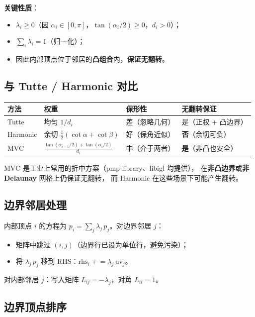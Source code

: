 \documentclass[11pt,a4paper]{article}
\begin{document}
\textbf{关键性质}：
\begin{itemize}
  \item $\lambda_i \ge 0$（因 $\alpha_i \in [0, \pi]$，$\tan(\alpha_i/2) \ge 0$，$d_i > 0$）；
  \item $\sum_i \lambda_i = 1$（归一化）；
  \item 因此内部顶点位于邻居的\textbf{凸组合}内，\textbf{保证无翻转}。
\end{itemize}

\subsection{与 Tutte / Harmonic 对比}

\begin{center}
\renewcommand{\arraystretch}{1.18}
\begin{tabular}{@{}p{2.4cm}p{3.6cm}p{3.6cm}p{4.0cm}@{}}
  \toprule
  \textbf{方法} & \textbf{权重} & \textbf{保形性} & \textbf{无翻转保证} \\
  \midrule
  Tutte   & 均匀 $1/d_i$ & 差（忽略几何） & 是（正权 + 凸边界） \\
  Harmonic & 余切 $\frac{1}{2}(\cot\alpha + \cot\beta)$ & 好（保角近似） & \textbf{否}（余切可负） \\
  MVC      & $\frac{\tan(\alpha_{i-1}/2) + \tan(\alpha_i/2)}{d_i}$ & 中（介于两者） & \textbf{是}（非凸也安全） \\
  \bottomrule
\end{tabular}
\end{center}

MVC 是工业上常用的折中方案（pmp-library、libigl 均提供），
在\textbf{非凸边界}或\textbf{非 Delaunay} 网格上仍保证无翻转，
而 Harmonic 在这些场景下可能产生翻转。

\subsection{边界邻居处理}

内部顶点 $i$ 的方程为 $p_i = \sum_j \lambda_j\, p_j$。对边界邻居 $j$：
\begin{itemize}
  \item 矩阵中跳过 $(i, j)$（边界行已设为单位行，避免污染）；
  \item 将 $\lambda_j\, p_j$ 移到 RHS：$\text{rhs}_i \mathrel{+}= \lambda_j\, \text{uv}_j$。
\end{itemize}
对内部邻居 $j$：写入矩阵 $L_{ij} = -\lambda_j$，对角 $L_{ii} = 1$。

\subsection{边界顶点排序}
\end{document}
